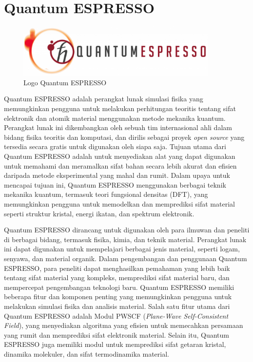 \section{Quantum ESPRESSO}
\begin{figure}
    \centering
    \includegraphics[width=10cm]{./gambar/qelogo.png}
    \caption{Logo Quantum ESPRESSO}
    \label{fig:kpoints}
\end{figure}
Quantum ESPRESSO adalah perangkat lunak simulasi fisika yang memungkinkan pengguna untuk melakukan perhitungan teoritis tentang sifat elektronik dan atomik material menggunakan metode mekanika kuantum. Perangkat lunak ini dikembangkan oleh sebuah tim internasional ahli dalam bidang fisika teoritis dan komputasi, dan dirilis sebagai proyek \textit{open source} yang tersedia secara gratis untuk digunakan oleh siapa saja. Tujuan utama dari Quantum ESPRESSO adalah untuk menyediakan alat yang dapat digunakan untuk memahami dan meramalkan sifat bahan secara lebih akurat dan efisien daripada metode eksperimental yang mahal dan rumit. Dalam upaya untuk mencapai tujuan ini, Quantum ESPRESSO menggunakan berbagai teknik mekanika kuantum, termasuk teori fungsional densitas (DFT), yang memungkinkan pengguna untuk memodelkan dan memprediksi sifat material seperti struktur kristal, energi ikatan, dan spektrum elektronik.

Quantum ESPRESSO dirancang untuk digunakan oleh para ilmuwan dan peneliti di berbagai bidang, termasuk fisika, kimia, dan teknik material. Perangkat lunak ini dapat digunakan untuk mempelajari berbagai jenis material, seperti logam, senyawa, dan material organik. Dalam pengembangan dan penggunaan Quantum ESPRESSO, para peneliti dapat menghasilkan pemahaman yang lebih baik tentang sifat material yang kompleks, memprediksi sifat material baru, dan mempercepat pengembangan teknologi baru. Quantum ESPRESSO memiliki beberapa fitur dan komponen penting yang memungkinkan pengguna untuk melakukan simulasi fisika dan analisis material. Salah satu fitur utama dari Quantum ESPRESSO adalah Modul PWSCF (\textit{Plane-Wave Self-Consistent Field}), yang menyediakan algoritma yang efisien untuk memecahkan persamaan \schro yang rumit dan memprediksi sifat elektronik material. Selain itu, Quantum ESPRESSO juga memiliki modul untuk memprediksi sifat getaran kristal, dinamika molekuler, dan sifat termodinamika material.

